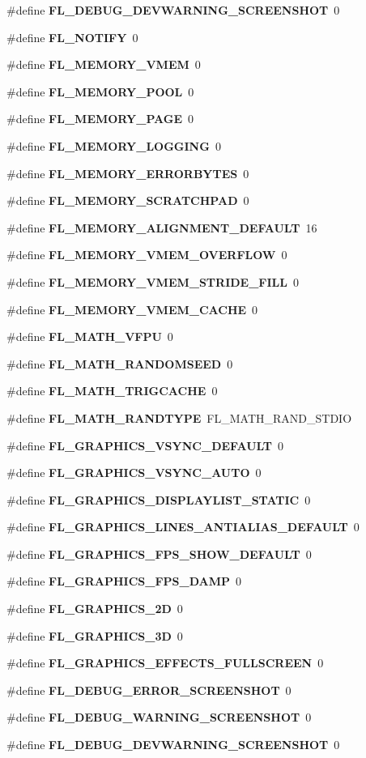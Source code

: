 \begin{CompactItemize}
\#define {\bf FL\_\-DEBUG\_\-DEVWARNING\_\-SCREENSHOT}~0
\item 
\#define {\bf FL\_\-NOTIFY}~0
\item 
\#define {\bf FL\_\-MEMORY\_\-VMEM}~0
\item 
\#define {\bf FL\_\-MEMORY\_\-POOL}~0
\item 
\#define {\bf FL\_\-MEMORY\_\-PAGE}~0
\item 
\#define {\bf FL\_\-MEMORY\_\-LOGGING}~0
\item 
\#define {\bf FL\_\-MEMORY\_\-ERRORBYTES}~0
\item 
\#define {\bf FL\_\-MEMORY\_\-SCRATCHPAD}~0
\item 
\#define {\bf FL\_\-MEMORY\_\-ALIGNMENT\_\-DEFAULT}~16
\item 
\#define {\bf FL\_\-MEMORY\_\-VMEM\_\-OVERFLOW}~0
\item 
\#define {\bf FL\_\-MEMORY\_\-VMEM\_\-STRIDE\_\-FILL}~0
\item 
\#define {\bf FL\_\-MEMORY\_\-VMEM\_\-CACHE}~0
\item 
\#define {\bf FL\_\-MATH\_\-VFPU}~0
\item 
\#define {\bf FL\_\-MATH\_\-RANDOMSEED}~0
\item 
\#define {\bf FL\_\-MATH\_\-TRIGCACHE}~0
\item 
\#define {\bf FL\_\-MATH\_\-RANDTYPE}~FL\_\-MATH\_\-RAND\_\-STDIO
\item 
\#define {\bf FL\_\-GRAPHICS\_\-VSYNC\_\-DEFAULT}~0
\item 
\#define {\bf FL\_\-GRAPHICS\_\-VSYNC\_\-AUTO}~0
\item 
\#define {\bf FL\_\-GRAPHICS\_\-DISPLAYLIST\_\-STATIC}~0
\item 
\#define {\bf FL\_\-GRAPHICS\_\-LINES\_\-ANTIALIAS\_\-DEFAULT}~0
\item 
\#define {\bf FL\_\-GRAPHICS\_\-FPS\_\-SHOW\_\-DEFAULT}~0
\item 
\#define {\bf FL\_\-GRAPHICS\_\-FPS\_\-DAMP}~0
\item 
\#define {\bf FL\_\-GRAPHICS\_\-2D}~0
\item 
\#define {\bf FL\_\-GRAPHICS\_\-3D}~0
\item 
\#define {\bf FL\_\-GRAPHICS\_\-EFFECTS\_\-FULLSCREEN}~0
\item 
\#define {\bf FL\_\-DEBUG\_\-ERROR\_\-SCREENSHOT}~0
\item 
\#define {\bf FL\_\-DEBUG\_\-WARNING\_\-SCREENSHOT}~0
\item 
\#define {\bf FL\_\-DEBUG\_\-DEVWARNING\_\-SCREENSHOT}~0

\end{CompactItemize}
